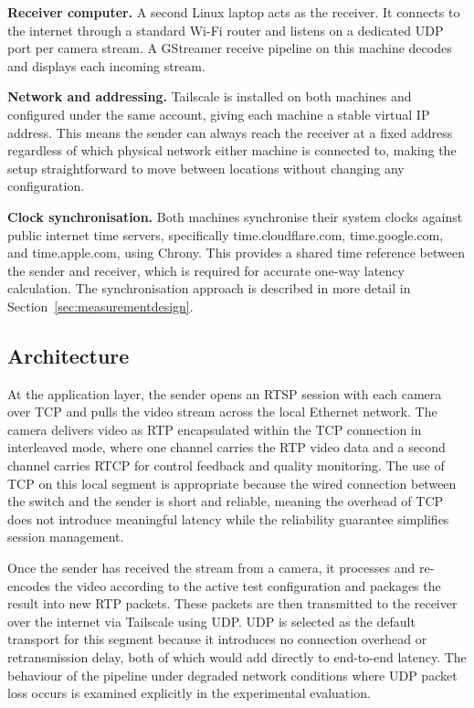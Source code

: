 \textbf{Receiver computer.} A second Linux laptop acts as the receiver. It connects to the internet through a standard Wi-Fi router and listens on a dedicated UDP port per camera stream. A GStreamer receive pipeline on this machine decodes and displays each incoming stream.

\textbf{Network and addressing.} Tailscale is installed on both machines and configured under the same account, giving each machine a stable virtual IP address. This means the sender can always reach the receiver at a fixed address regardless of which physical network either machine is connected to, making the setup straightforward to move between locations without changing any configuration.

\textbf{Clock synchronisation.} Both machines synchronise their system clocks against public internet time servers, specifically time.cloudflare.com, time.google.com, and time.apple.com, using Chrony. This provides a shared time reference between the sender and receiver, which is required for accurate one-way latency calculation. The synchronisation approach is described in more detail in Section~\ref{sec:measurementdesign}.


\subsection{Architecture}

At the application layer, the sender opens an RTSP session with each camera over TCP and pulls the video stream across the local Ethernet network. The camera delivers video as RTP encapsulated within the TCP connection in interleaved mode, where one channel carries the RTP video data and a second channel carries RTCP for control feedback and quality monitoring. The use of TCP on this local segment is appropriate because the wired connection between the switch and the sender is short and reliable, meaning the overhead of TCP does not introduce meaningful latency while the reliability guarantee simplifies session management.

Once the sender has received the stream from a camera, it processes and re-encodes the video according to the active test configuration and packages the result into new RTP packets. These packets are then transmitted to the receiver over the internet via Tailscale using UDP. UDP is selected as the default transport for this segment because it introduces no connection overhead or retransmission delay, both of which would add directly to end-to-end latency. The behaviour of the pipeline under degraded network conditions where UDP packet loss occurs is examined explicitly in the experimental evaluation.

